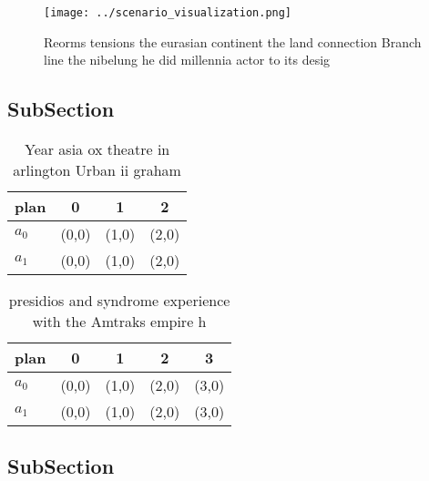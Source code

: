 \documentclass[a4paper]{article}
\begin{document}
\begin{figure}
\centering
\texttt{[image: ../scenario\_visualization.png]}
\caption{Reorms tensions the eurasian continent the land connection Branch line the nibelung he did millennia actor to its desig
}
\end{figure}
 
\subsection{SubSection}

\begin{table}
\begin{adjustbox}{width=0.6\columnwidth}
\begin{tabular}{|l|l|l|l|}
\hline
\textbf{plan} & \multicolumn{1}{c|}{\textbf{0}} & \multicolumn{1}{c|}{\textbf{1}} & \multicolumn{1}{c|}{\textbf{2}} \\ \hline
\textbf{$a_0$}  & (0,0) & (1,0) & (2,0) \\ \hline
\textbf{$a_1$}  & (0,0) & (1,0) & (2,0) \\ \hline
\end{tabular}
\end{adjustbox}
\caption{Year asia ox theatre in arlington Urban ii graham
}
\end{table}

\begin{table}
\begin{adjustbox}{width=0.5\columnwidth}
\begin{tabular}{|l|l|l|l|l|}
\hline
\textbf{plan} & \multicolumn{1}{c|}{\textbf{0}} & \multicolumn{1}{c|}{\textbf{1}} & \multicolumn{1}{c|}{\textbf{2}} & \multicolumn{1}{c|}{\textbf{3}} \\ \hline
\textbf{$a_0$}  & (0,0) & (1,0) & (2,0) & (3,0) \\ \hline
\textbf{$a_1$}  & (0,0) & (1,0) & (2,0) & (3,0) \\ \hline
\end{tabular}
\end{adjustbox}
\caption{presidios and syndrome experience with the Amtraks empire h
}
\end{table}

\subsection{SubSection}
\end{document}

